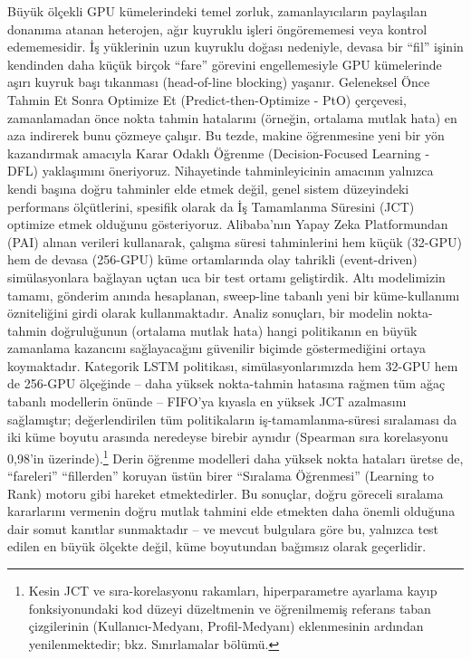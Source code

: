 \begin{turkishabstract}\label{chp:turkishabstract}
\vspace{-1.5em}

Büyük ölçekli GPU kümelerindeki temel zorluk, zamanlayıcıların paylaşılan donanıma atanan heterojen, ağır kuyruklu işleri öngörememesi veya kontrol edememesidir. İş yüklerinin uzun kuyruklu doğası nedeniyle, devasa bir ``fil'' işinin kendinden daha küçük birçok ``fare'' görevini engellemesiyle GPU kümelerinde aşırı kuyruk başı tıkanması (head-of-line blocking) yaşanır. Geleneksel Önce Tahmin Et Sonra Optimize Et (Predict-then-Optimize - PtO) çerçevesi, zamanlamadan önce nokta tahmin hatalarını (örneğin, ortalama mutlak hata) en aza indirerek bunu çözmeye çalışır. Bu tezde, makine öğrenmesine yeni bir yön kazandırmak amacıyla Karar Odaklı Öğrenme (Decision-Focused Learning - DFL) yaklaşımını öneriyoruz. Nihayetinde tahminleyicinin amacının yalnızca kendi başına doğru tahminler elde etmek değil, genel sistem düzeyindeki performans ölçütlerini, spesifik olarak da İş Tamamlanma Süresini (JCT) optimize etmek olduğunu gösteriyoruz. Alibaba'nın Yapay Zeka Platformundan (PAI) alınan verileri kullanarak, çalışma süresi tahminlerini hem küçük (32-GPU) hem de devasa (256-GPU) küme ortamlarında olay tahrikli (event-driven) simülasyonlara bağlayan uçtan uca bir test ortamı geliştirdik. Altı modelimizin tamamı, gönderim anında hesaplanan, sweep-line tabanlı yeni bir küme-kullanımı özniteliğini girdi olarak kullanmaktadır. Analiz sonuçları, bir modelin nokta-tahmin doğruluğunun (ortalama mutlak hata) hangi politikanın en büyük zamanlama kazancını sağlayacağını güvenilir biçimde göstermediğini ortaya koymaktadır. Kategorik LSTM politikası, simülasyonlarımızda hem 32-GPU hem de 256-GPU ölçeğinde -- daha yüksek nokta-tahmin hatasına rağmen tüm ağaç tabanlı modellerin önünde -- FIFO'ya kıyasla en yüksek JCT azalmasını sağlamıştır; değerlendirilen tüm politikaların iş-tamamlanma-süresi sıralaması da iki küme boyutu arasında neredeyse birebir aynıdır (Spearman sıra korelasyonu 0,98'in üzerinde).\footnote{Kesin JCT ve sıra-korelasyonu rakamları, hiperparametre ayarlama kayıp fonksiyonundaki kod düzeyi düzeltmenin ve öğrenilmemiş referans taban çizgilerinin (Kullanıcı-Medyanı, Profil-Medyanı) eklenmesinin ardından yenilenmektedir; bkz. Sınırlamalar bölümü.} Derin öğrenme modelleri daha yüksek nokta hataları üretse de, ``fareleri'' ``fillerden'' koruyan üstün birer ``Sıralama Öğrenmesi'' (Learning to Rank) motoru gibi hareket etmektedirler. Bu sonuçlar, doğru göreceli sıralama kararlarını vermenin doğru mutlak tahmini elde etmekten daha önemli olduğuna dair somut kanıtlar sunmaktadır -- ve mevcut bulgulara göre bu, yalnızca test edilen en büyük ölçekte değil, küme boyutundan bağımsız olarak geçerlidir.

\end{turkishabstract}